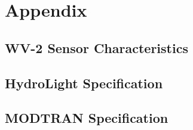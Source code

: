 \appendix
\chapter*{Appendix}
\section{WV-2 Sensor Characteristics}
\section{HydroLight Specification}
\section{MODTRAN Specification}